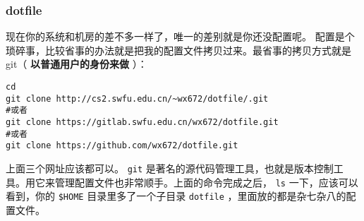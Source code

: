 \documentclass{wx672ctexart}
\begin{document}
\subsubsection{dotfile}
\label{sec:orgc7ea5bf}
现在你的系统和机房的差不多一样了，唯一的差别就是你还没配置呢。
配置是个琐碎事，比较省事的办法就是把我的配置文件拷贝过来。最省事的拷贝方式就是
git（ \textbf{以普通用户的身份来做} ）：
\begin{verbatim}
cd
git clone http://cs2.swfu.edu.cn/~wx672/dotfile/.git
#或者
git clone https://gitlab.swfu.edu.cn/wx672/dotfile.git
#或者
git clone https://github.com/wx672/dotfile.git
\end{verbatim}

上面三个网址应该都可以。 \texttt{git} 是著名的源代码管理工具，也就是版本控制工具。用它来管理配置文件也非常顺手。上面的命令完成之后， \texttt{ls} 一下，应该可以看到，你的 \texttt{\$HOME} 目录里多了一个子目录 \texttt{dotfile} ，里面放的都是杂七杂八的配置文件。
\end{document}

